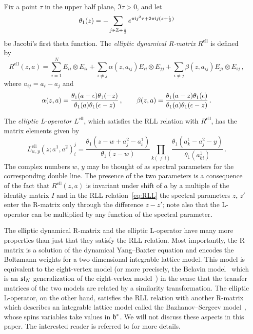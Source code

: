 Fix a point $\tau$ in the upper half plane, $\Im\tau > 0$, and let
 \begin{equation}
  \theta_1(z)
  =
  - \sum_{j \in \mathbb{Z} + \frac12} e^{\pi\mathrm{i} j^2\tau + 2\pi\mathrm{i} j(z + \frac12)}
\end{equation}
be Jacobi's first theta function.  The \emph{elliptic dynamical
  R-matrix} $R^{\text{ell}}$ is defined by~\cite{Felder:1994be,
  Felder:1994pb, MR1645196}
\begin{equation}
  R^{\text{ell}}(z,a)
  =
  \sum_{i=1}^N E_{ii} \otimes E_{ii}
  + \sum_{i \neq j} \alpha(z,a_{ij}) E_{ii} \otimes E_{jj}
  + \sum_{i \neq j} \beta(z,a_{ij}) E_{ji} \otimes E_{ij}
  \,,
\end{equation}
where $a_{ij} = a_i - a_j$ and
\begin{equation}
  \alpha(z,a)
  = \frac{\theta_1(a+\epsilon) \theta_1(-z)}
         {\theta_1(a) \theta_1(\epsilon - z)} \,,
  \qquad
  \beta(z,a)
  = \frac{\theta_1(a - z) \theta_1(\epsilon)}
          {\theta_1(a) \theta_1(\epsilon - z)} \,.
\end{equation}

The \emph{elliptic L-operator} $L^{\text{ell}}$, which satisfies the
RLL relation with $R^{\text{ell}}$, has the matrix elements given
by~\cite{MR1463830}
\begin{equation}
  \label{eq:L-ell}
  L^{\text{ell}}_{w,y}(z; a^1, a^2)^j_i
  =
  \frac{\theta_1(z - w + a^2_j - a^1_i)}{\theta_1(z - w)}
  \prod_{k (\neq i)}
  \frac{\theta_1(a^1_k - a^2_j - y)}{\theta_1(a^1_{ki})}
  \,.
\end{equation}
The complex numbers $w$, $y$ may be thought of as spectral parameters
for the corresponding double line.  The presence of the two parameters
is a consequence of the fact that $R^{\text{ell}}(z,a)$ is invariant
under shift of $a$ by a multiple of the identity matrix $I$ and in the
RLL relation~\eqref{eq:RLL} the spectral parameters $z$, $z'$ enter
the R-matrix only through the difference $z - z'$; note also that the
L-operator can be multiplied by any function of the spectral
parameter.

The elliptic dynamical R-matrix and the elliptic L-operator have many
more properties than just that they satisfy the RLL relation.  Most
importantly, the R-matrix is a solution of the dynamical Yang--Baxter
equation and encodes the Boltzmann weights for a two-dimensional
integrable lattice model.  This model is equivalent to the
eight-vertex model (or more precisely, the Belavin
model~\cite{Belavin:1981ix} which is an $\mathfrak{sl}_N$ generalization of the
eight-vertex model~\cite{Baxter:1971cr, Baxter:1972hz}) in the sense
that the transfer matrices of the two models are related by a
similarity transformation.  The elliptic L-operator, on the other
hand, satisfies the RLL relation with another R-matrix which describes
an integrable lattice model called the Bazhanov--Sergeev
model~\cite{Bazhanov:2010kz, Bazhanov:2011mz}, whose spins variables
take values in $\mathfrak{h}^*$.  We will not discuss these aspects in this
paper.  The interested reader is referred to \cite{Yagi:2017hmj} for
more details.






